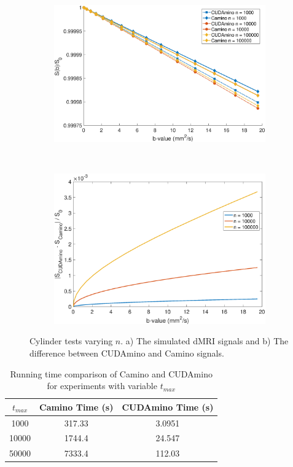 \begin{figure}
  \centering
  \begin{subfigure}{0.49\textwidth}
    \centering
    \includegraphics[width=\textwidth]{figures/cudamino/cyl_nspin.eps}
    \caption{}
    \label{fig:cyl_nspin_sig}
  \end{subfigure}
  ~
  \begin{subfigure}{0.49\textwidth}
    \includegraphics[width=\textwidth]{figures/cudamino/cyl_nspin_diff.eps}
    \caption{}
    \label{fig:cyl_nspin_diff}
  \end{subfigure}
  \caption{Cylinder tests varying $n$. a) The simulated \ac{dMRI} signals and b) The difference between CUDAmino and Camino signals.}
  \label{fig:cyl_nspin}
\end{figure}


\begin{table}
  \centering
  \begin{tabular}{|c|c|c|}
    \hline
    $t_{max}$ & Camino Time (s) & CUDAmino Time (s)\\\hline
    1000 & 317.33& 3.0951\\
    10000 & 1744.4& 24.547\\
    50000 & 7333.4& 112.03\\\hline
  \end{tabular}
  \caption{Running time comparison of Camino and CUDAmino for experiments with variable $t_{max}$}
  \label{tab:cyl_tmax_time}
\end{table}


